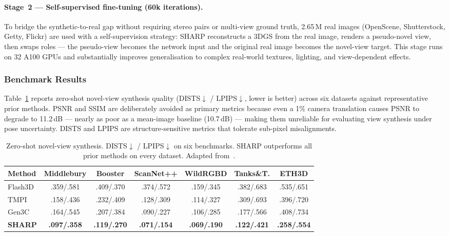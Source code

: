 \paragraph{Stage~2 — Self-supervised fine-tuning (60k iterations).} To bridge the synthetic-to-real gap without requiring stereo pairs or multi-view ground truth, 2.65\,M real images (OpenScene, Shutterstock, Getty, Flickr) are used with a self-supervision strategy: SHARP reconstructs a 3DGS from the real image, renders a pseudo-novel view, then swaps roles — the pseudo-view becomes the network input and the original real image becomes the novel-view target. This stage runs on 32 A100 GPUs and substantially improves generalisation to complex real-world textures, lighting, and view-dependent effects.

\subsubsection{Benchmark Results}

Table~\ref{tab:sharp_benchmark} reports zero-shot novel-view synthesis quality (DISTS$\downarrow$ / LPIPS$\downarrow$, lower is better) across six datasets against representative prior methods. PSNR and SSIM are deliberately avoided as primary metrics because even a 1\% camera translation causes PSNR to degrade to 11.2\,dB — nearly as poor as a mean-image baseline (10.7\,dB) — making them unreliable for evaluating view synthesis under pose uncertainty. DISTS and LPIPS are structure-sensitive metrics that tolerate sub-pixel misalignments.

\begin{table}[htbp]
\centering
\caption{Zero-shot novel-view synthesis. DISTS$\downarrow$ / LPIPS$\downarrow$ on six benchmarks. SHARP outperforms all prior methods on every dataset. Adapted from~\cite{mescheder2025sharp}.}
\label{tab:sharp_benchmark}
\setlength{\tabcolsep}{5pt}
\begin{tabular}{lcccccc}
\toprule
\textbf{Method} & \textbf{Middlebury} & \textbf{Booster} & \textbf{ScanNet++} & \textbf{WildRGBD} & \textbf{Tanks\&T.} & \textbf{ETH3D} \\
\midrule
Flash3D     & .359/.581 & .409/.370 & .374/.572 & .159/.345 & .382/.683 & .535/.651 \\
TMPI        & .158/.436 & .232/.409 & .128/.309 & .114/.327 & .309/.693 & .396/.720 \\
Gen3C       & .164/.545 & .207/.384 & .090/.227 & .106/.285 & .177/.566 & .408/.734 \\
\midrule
\textbf{SHARP} & \textbf{.097/.358} & \textbf{.119/.270} & \textbf{.071/.154} & \textbf{.069/.190} & \textbf{.122/.421} & \textbf{.258/.554} \\
\bottomrule
\end{tabular}
\end{table}

